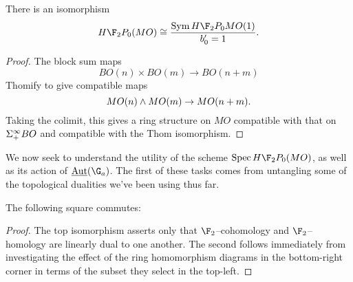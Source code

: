 \begin{corollary}\label{HF2MOisFree}
There is an isomorphism \[H\F_2P_0(MO) \cong \frac{\Sym H\F_2P_0 MO(1)}{b'_0 = 1}.\]
\end{corollary}
\begin{proof}
The block sum maps \[BO(n) \times BO(m) \to BO(n+m)\] Thomify to give compatible maps \[MO(n) \wedge MO(m) \to MO(n+m).\]  Taking the colimit, this gives a ring structure on $MO$ compatible with that on $\Sigma^\infty_+ BO$ and compatible with the Thom isomorphism.
\end{proof}

We now seek to understand the utility of the scheme $\Spec H\F_2P_0(MO)$, as well as its action of $\InternalAut(\G_a)$.  The first of these tasks comes from untangling some of the topological dualities we've been using thus far.
\begin{lemma}\label{DetectingMORingMapsInHomotopy}
The following square commutes:
\begin{center}
\end{center}
\end{lemma}
\begin{proof}
The top isomorphism asserts only that $\F_2$--cohomology and $\F_2$--homology are linearly dual to one another.  The second follows immediately from investigating the effect of the ring homomorphism diagrams in the bottom-right corner in terms of the subset they select in the top-left.
\end{proof}


